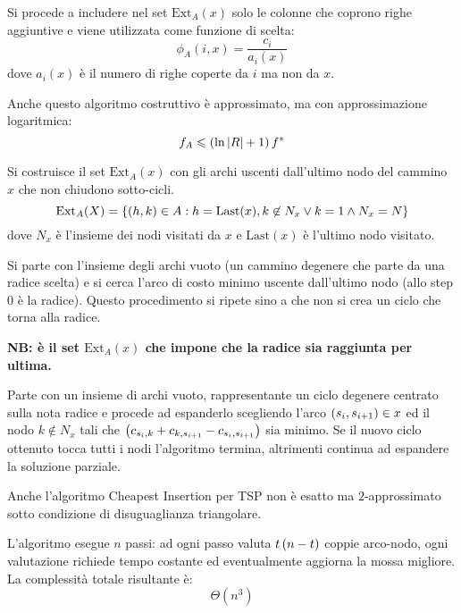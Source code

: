 \documentclass[\main/main.tex]{subfiles}
\providecommand{\Last}{\text{Last}}
\providecommand{\Ext}{\text{Ext}_A}
\begin{document}
\begin{multicols}{2}
\begin{definition}
    Si procede a includere nel set \(\Ext(x)\) solo le colonne che coprono righe aggiuntive e viene utilizzata come funzione di scelta:
    \[
        \phi_A(i, x) = \frac{c_i}{a_i(x)}
    \]
    dove \(a_i(x)\) è il numero di righe coperte da \(i\) ma non da \(x\).
\end{definition}
\begin{observation}
    Anche questo algoritmo costruttivo è approssimato, ma con approssimazione logaritmica:
    \[
        f_A \leqslant \left(\ln\left\lvert R\right\rvert+1\right) f^*
    \]
\end{observation}
\begin{definition}
    Si costruisce il set \(\Ext(x)\) con gli archi uscenti dall'ultimo nodo del cammino \(x\) che non chiudono sotto-cicli.
    \[
        \Ext(X) = \crl{\rnd{h,k} \in A: h = \Last(x), k \not\in N_x \lor k=1  \land  N_x = N}
    \]
    dove \(N_x\) è l'insieme dei nodi visitati da \(x\) e \(\Last(x)\) è l'ultimo nodo visitato.
    
    Si parte con l'insieme degli archi vuoto (un cammino degenere che parte da una radice scelta) e si cerca l'arco di costo minimo uscente dall'ultimo nodo (allo step \(0\) è la radice). Questo procedimento si ripete sino a che non si crea un ciclo che torna alla radice.
    
    \textbf{NB: è il set \(\Ext(x)\) che impone che la radice sia raggiunta per ultima.}
\end{definition}
\begin{definition}
    Parte con un insieme di archi vuoto, rappresentante un ciclo degenere centrato sulla nota radice e procede ad espanderlo scegliendo l'arco \(\left(s_i, s_{i+1}\right) \in x\) ed il nodo \(k \not\in N_x\) tali che \(\left(c_{s_i, k} + c_{k, s_{i+1}} - c_{s_i, s_{i+1}}\right)\) sia minimo. Se il nuovo ciclo ottenuto tocca tutti i nodi l'algoritmo termina, altrimenti continua ad espandere la soluzione parziale.
\end{definition}
\begin{observation}
    Anche l'algoritmo Cheapest Insertion per TSP non è esatto ma \(2\)-approssimato sotto condizione di disuguaglianza triangolare.
\end{observation}
\begin{complexity}
    L'algoritmo esegue \(n\) passi: ad ogni passo valuta \(t\left(n-t\right)\) coppie arco-nodo, ogni valutazione richiede tempo costante ed eventualmente aggiorna la mossa migliore. La complessità totale risultante è:
    \[
        \Theta(n^3)
    \]
    

\end{complexity}
\end{multicols}
\end{document}
